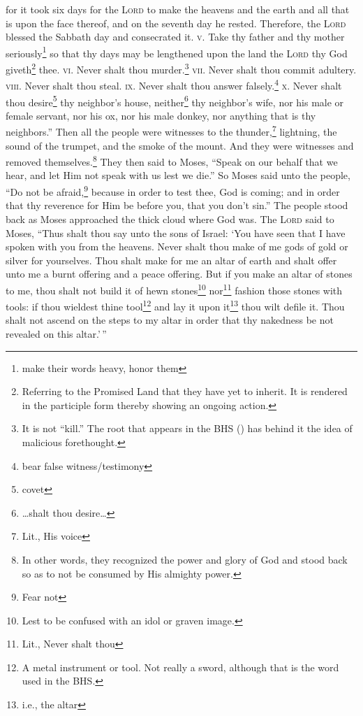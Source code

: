 \begin{enumerate*}[mode=unboxed]
     for it took six days for the \textsc{Lord} to make the heavens and the earth and all that is upon the face thereof, and on the seventh day he rested. Therefore, the \textsc{Lord} blessed the Sabbath day and consecrated it.%
     \textsc{v.} Take thy father and thy mother seriously\footnote{make their words heavy, honor them} so that thy days may be lengthened upon the land the \textsc{Lord} thy God giveth\footnote{Referring to the Promised Land that they have yet to inherit. It is rendered in the participle form thereby showing an ongoing action.} thee.%
     \textsc{vi.} Never shalt thou murder.\footnote{It is not ``kill.'' The root that appears in the BHS () has behind it the idea of malicious forethought.}%
     \textsc{vii.} Never shalt thou commit adultery.%
     \textsc{viii.} Never shalt thou steal.%
     \textsc{ix.} Never shalt thou answer falsely.\footnote{bear false witness/testimony}%
     \textsc{x.} Never shalt thou desire\footnote{covet} thy neighbor's house, neither\footnote{\dots shalt thou desire\dots} thy neighbor's wife, nor his male or female servant, nor his ox, nor his male donkey, nor anything that is thy neighbors.''%
     Then all the people were witnesses to the thunder,\footnote{Lit., His voice} lightning, the sound of the trumpet, and the smoke of the mount. And they were witnesses and removed themselves.\footnote{In other words, they recognized the power and glory of God and stood back so as to not be consumed by His almighty power.}%
     They then said to Moses, ``Speak on our behalf that we hear, and let Him not speak with us lest we die.''%
     So Moses said unto the people, ``Do not be afraid,\footnote{Fear not} because in order to test thee, God is coming; and in order that thy reverence for Him be before you, that you don't sin.''%
     The people stood back as Moses approached the thick cloud where God was.%
     The \textsc{Lord} said to Moses, ``Thus shalt thou say unto the sons of Israel: `You have seen that I have spoken with you from the heavens.%
     Never shalt thou make of me gods of gold or silver for yourselves.%
     Thou shalt make for me an altar of earth and shalt offer unto me a burnt offering and a peace offering.%
     But if you make an altar of stones to me, thou shalt not build it of hewn stones\footnote{Lest to be confused with an idol or graven image.} nor\footnote{Lit., Never shalt thou} fashion those stones with tools: if thou wieldest thine tool\footnote{A metal instrument or tool. Not really a sword, although that is the word used in the BHS.} and lay it upon it\footnote{i.e., the altar} thou wilt defile it.%
     Thou shalt not ascend on the steps to my altar in order that thy nakedness be not revealed on this altar.'\,''%
\end{enumerate*}
